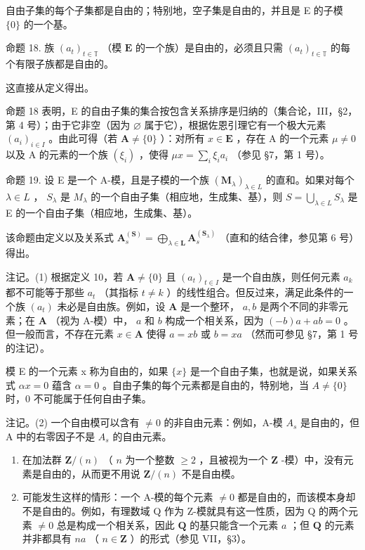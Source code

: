 自由子集的每个子集都是自由的；特别地，空子集是自由的，并且是 E 的子模 \(\{0\}\) 的一个基。

命题 18. 族 \((a_{t})_{t\in \mathbb{T}}\) （模 \(\mathbf{E}\) 的一个族）是自由的，必须且只需 \((a_{t})_{t\in \mathbb{T}}\) 的每个有限子族都是自由的。

这直接从定义得出。

命题 18 表明，E 的自由子集的集合按包含关系排序是归纳的（集合论，III，§2，第 4 号）；由于它非空（因为 \(\varnothing\) 属于它），根据佐恩引理它有一个极大元素 \((a_{i})_{i\in I}\) 。由此可得（若 \(\mathbf{A}\neq \{0\}\) ）：对所有 \(x\in \mathbf{E}\) ，存在 A 的一个元素 \(\mu \neq 0\) 以及 A 的元素的一个族 \((\xi_{i})\) ，使得 \(\mu x = \sum_{i}\xi_{i}a_{i}\) （参见 §7，第 1 号）。

命题 19. 设 E 是一个 A-模，且是子模的一个族 \((\mathbf{M}_{\lambda})_{\lambda \in L}\) 的直和。如果对每个 \(\lambda \in L\) ， \(S_{\lambda}\) 是 \(M_{\lambda}\) 的一个自由子集（相应地，生成集、基），则 \(S = \bigcup_{\lambda \in L} S_{\lambda}\) 是 E 的一个自由子集（相应地，生成集、基）。

该命题由定义以及关系式 \(\mathbf{A}_{s}^{(\mathbf{S})} = \bigoplus_{\lambda \in \mathbf{L}} \mathbf{A}_{s}^{(\mathbf{S}_{\lambda})}\) （直和的结合律，参见第 6 号）得出。

注记。(1) 根据定义 10，若 \(\mathbf{A} \neq \{0\}\) 且 \((a_{t})_{t \in I}\) 是一个自由族，则任何元素 \(a_{k}\) 都不可能等于那些 \(a_{t}\) （其指标 \(t \neq k\) ）的线性组合。但反过来，满足此条件的一个族 \((a_{t})\) 未必是自由族。例如，设 \(\mathbf{A}\) 是一个整环， \(a, b\) 是两个不同的非零元素；在 \(\mathbf{A}\) （视为 A-模）中， \(a\) 和 \(b\) 构成一个相关系，因为 \((-b)a + ab = 0\) 。但一般而言，不存在元素 \(x \in \mathbf{A}\) 使得 \(a = xb\) 或 \(b = xa\) （然而可参见 §7，第 1 号的注记）。

模 E 的一个元素 x 称为自由的，如果 \(\{x\}\) 是一个自由子集，也就是说，如果关系式 \(\alpha x = 0\) 蕴含 \(\alpha = 0\) 。自由子集的每个元素都是自由的，特别地，当 \(A \neq \{0\}\) 时，0 不可能属于任何自由子集。

注记。(2) 一个自由模可以含有 \(\neq0\) 的非自由元素：例如，A-模 \(A_{s}\) 是自由的，但 A 中的右零因子不是 \(A_{s}\) 的自由元素。

\begin{enumerate}
\def\labelenumi{(\arabic{enumi})}
\setcounter{enumi}{2}
\item
  在加法群 \(\mathbf{Z} / (n)\) （ \(n\) 为一个整数 \(\geqslant 2\) ，且被视为一个 \(\mathbf{Z}\) -模）中，没有元素是自由的，从而更不用说 \(\mathbf{Z} / (n)\) 不是自由模。
\item
  可能发生这样的情形：一个 A-模的每个元素 \(\neq0\) 都是自由的，而该模本身却不是自由的。例如，有理数域 Q 作为 Z-模就具有这一性质，因为 Q 的两个元素 \(\neq0\) 总是构成一个相关系，因此 \(\mathbf{Q}\) 的基只能含一个元素 \(a\) ；但 \(\mathbf{Q}\) 的元素并非都具有 \(na\) （ \(n \in \mathbf{Z}\) ）的形式（参见 VII，§3）。
\end{enumerate}

